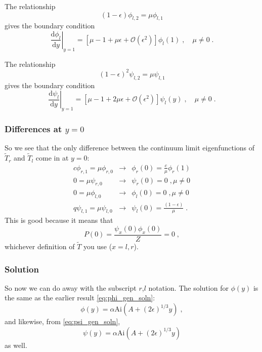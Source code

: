 \documentclass[a4paper,10pt]{article}
\newcommand{\D}{\mathrm{d}}
\newcommand{\Or}{\mathcal{O}}
\newcommand{\Ai}{\mathrm{Ai}}
\begin{document}
The relationship
\begin{equation}
  (1-\epsilon)\phi_{l,2} = \mu \phi_{l,1}
\end{equation}
gives the boundary condition
\begin{equation}\label{eq:lr_bc}
  \left. \frac{ \D \phi_l}{\D y} \right|_{y=1} = [\mu - 1 + \mu \epsilon + \Or(\epsilon^2) ] \phi_l(1) \;, \quad \mu \ne 0 \;.
\end{equation}

The relationship
\begin{equation}
  (1-\epsilon)^2 \psi_{l,2} = \mu \psi_{l,1} 
\end{equation}
gives the boundary condition
\begin{equation}\label{eq:ll_bc}
  \left. \frac{ \D \psi_l}{ \D y} \right|_{y=1} = [\mu -1  + 2\mu\epsilon + \Or(\epsilon^2) ] \psi_l(y) \;, \quad \mu \ne 0 \;.
\end{equation}

\subsubsection{Differences at $y=0$}

So we see that the only difference between the continuum limit eigenfunctions of $\tilde{T}_r$ and $\tilde{T}_l$ come in at $y=0$:
\begin{eqnarray}
  c\phi_{r,1} = \mu \phi_{r,0} & \to & \phi_r(0) = \frac{c}{\mu} \phi_r(1) \\
  0 = \mu \psi_{r,0} & \to & \psi_r(0) = 0 \;, \mu \ne 0 \\
  0 = \mu \phi_{l,0} & \to & \phi_l(0) = 0 \;, \mu \ne 0 \\
  q \psi_{l,1} = \mu \psi_{l,0} & \to & \psi_l(0) = \frac{(1-\epsilon)}{\mu} \;.
\end{eqnarray}
 This is good because it means that
\begin{equation}
  P(0) = \frac{\psi_x(0)\phi_x(0)}{Z} = 0 \;,
\end{equation}
whichever definition of $\tilde{T}$ you use ($x = l,r$).

\subsubsection{Solution}

So now we can do away with the subscript $r$,$l$ notation. The solution for $\phi(y)$ is the same as the earlier result \eqref{eq:phi_gen_soln}:
\begin{equation}
 \phi(y) = \alpha \Ai(A + (2\epsilon)^{1/3} y) \;,
\end{equation}
and likewise, from \eqref{eq:psi_gen_soln},
\begin{equation}
  \psi(y) = \alpha \Ai(A + (2\epsilon)^{1/3} y)
\end{equation}
as well.
\end{document}
